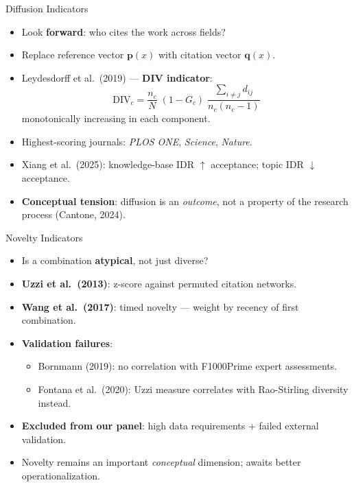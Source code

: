 \documentclass[aspectratio=169,10pt]{beamer}
\begin{document}
\begin{frame}{Diffusion Indicators}
\begin{itemize}
  \item Look \textbf{forward}: who cites the work across fields?
  \item Replace reference vector $\mathbf{p}(x)$ with citation vector
        $\mathbf{q}(x)$.
  \item Leydesdorff et al.\ (2019) --- \textbf{DIV indicator}:
  \[
    \mathrm{DIV}_c = \frac{n_c}{N}\;(1 - G_c)\;
    \frac{\sum_{i\neq j} d_{ij}}{n_c(n_c-1)}
  \]
  monotonically increasing in each component.
  \item Highest-scoring journals: \emph{PLOS ONE}, \emph{Science}, \emph{Nature}.
  \item Xiang et al.\ (2025): knowledge-base IDR $\uparrow$ acceptance;
        topic IDR $\downarrow$ acceptance.
  \item \textbf{Conceptual tension}: diffusion is an \emph{outcome},
        not a property of the research process (Cantone, 2024).
\end{itemize}
\end{frame}

\begin{frame}{Novelty Indicators}
\begin{itemize}
  \item Is a combination \textbf{atypical}, not just diverse?
  \item \textbf{Uzzi et al.\ (2013)}: z-score against permuted citation
        networks.
  \item \textbf{Wang et al.\ (2017)}: timed novelty --- weight by recency
        of first combination.
  \item \textbf{Validation failures}:
  \begin{itemize}
    \item Bornmann (2019): no correlation with F1000Prime expert assessments.
    \item Fontana et al.\ (2020): Uzzi measure correlates with
          Rao-Stirling diversity instead.
  \end{itemize}
  \item[$\Rightarrow$] \textbf{Excluded from our panel}: high data
        requirements + failed external validation.
  \item Novelty remains an important \emph{conceptual} dimension;
        awaits better operationalization.
\end{itemize}
\end{frame}
\end{document}
